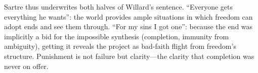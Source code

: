 Sartre thus underwrites both halves of Willard's sentence. ``Everyone gets everything he
wants'': the world provides ample situations in which freedom can adopt ends and see them
through. ``For my sins I got one'': because the end was implicitly a bid for the impossible
synthesis (completion, immunity from ambiguity), getting it reveals the project as bad-faith
flight from freedom's structure. Punishment is not failure but clarity—the clarity that
completion was never on offer.
